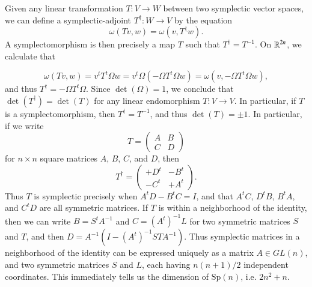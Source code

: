 Given any linear transformation $T: V \to W$ between two symplectic vector spaces, we can define a symplectic-adjoint $T^\dag: W \to V$ by the equation
%
\[ \omega(Tv,w) = \omega(v, T^\dag w). \]
%
A symplectomorphism is then precisely a map $T$ such that $T^\dag = T^{-1}$. On $\operatorname{\mathbb{R}}^{2n}$, we calculate that

\[ \omega(Tv, w) = v^t T^t \Omega w = v^t \Omega (- \Omega T^t \Omega w) = \omega(v, - \Omega T^t \Omega w), \]
%
and thus $T^\dag = - \Omega T^t \Omega$. Since $\det(\Omega) = 1$, we conclude that $\det(T^\dag) = \det(T)$ for any linear endomorphism $T: V \to V$. In particular, if $T$ is a symplectomorphism, then $T^\dag = T^{-1}$, and thus $\det(T) = \pm 1$. In particular, if we write
%
\[ T = \begin{pmatrix} A & B \\ C & D \end{pmatrix} \]
%
for $n \times n$ square matrices $A$, $B$, $C$, and $D$, then
%
\[ T^\dag = \begin{pmatrix} +D^t & -B^t \\ - C^t & + A^t \end{pmatrix}. \]
%
Thus $T$ is symplectic precisely when $A^t D - B^t C = I$, and that $A^tC$, $D^t B$, $B^t A$, and $C^t D$ are all symmetric matrices. If $T$ is within a neighborhood of the identity, then we can write $B = S^t A^{-1}$ and $C = (A^t)^{-1} L$ for two symmetric matrices $S$ and $T$, and then $D = A^{-1}(I - (A^t)^{-1} ST A^{-1})$. Thus symplectic matrices in a neighborhood of the identity can be expressed uniquely as a matrix $A \in GL(n)$, and two symmetric matrices $S$ and $L$, each having $n(n+1)/2$ independent coordinates. This immediately tells us the dimension of $\text{Sp}(n)$, i.e. $2n^2 + n$.

